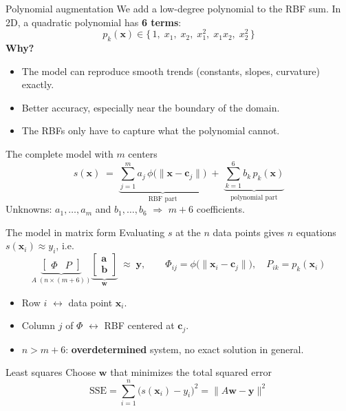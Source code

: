 \documentclass[10pt,aspectratio=169]{beamer}
\newcommand{\hl}[1]{\textcolor{accent}{\textbf{#1}}}
\newcommand{\x}{\bm{x}}
\newcommand{\cc}{\bm{c}}
\begin{document}
\begin{frame}{Polynomial augmentation}
  We add a low-degree polynomial to the RBF sum. In 2D, a quadratic
  polynomial has \hl{6 terms}:
  \[
    p_k(\x) \in \{\,1,\; x_1,\; x_2,\; x_1^2,\; x_1x_2,\; x_2^2\,\}
  \]
  \textbf{Why?}
  \begin{itemize}
    \item The model can reproduce smooth trends (constants, slopes,
          curvature) exactly.
    \item Better accuracy, especially near the boundary of the domain.
    \item The RBFs only have to capture what the polynomial cannot.
  \end{itemize}
  \vspace{0.5em}
  \begin{block}{The complete model with $m$ centers}
    \[
      s(\x) \;=\; \underbrace{\sum_{j=1}^{m} a_j\,
        \phi\big(\lVert \x - \cc_j \rVert\big)}_{\text{RBF part}}
      \;+\; \underbrace{\sum_{k=1}^{6} b_k\, p_k(\x)}_{\text{polynomial part}}
    \]
    Unknowns: $a_1,\dots,a_m$ and $b_1,\dots,b_6$ \;$\Rightarrow$\; $m+6$ coefficients.
  \end{block}
\end{frame}

\begin{frame}{The model in matrix form}
  Evaluating $s$ at the $n$ data points gives $n$ equations
  $s(\x_i) \approx y_i$, i.e.
  \[
    \underbrace{\begin{bmatrix} \Phi & P \end{bmatrix}}_{A\;(n\times(m+6))}
    \underbrace{\begin{bmatrix} \bm{a} \\ \bm{b} \end{bmatrix}}_{\bm{w}}
    \;\approx\; \bm{y},
    \qquad
    \Phi_{ij} = \phi\big(\lVert \x_i - \cc_j\rVert\big), \quad
    P_{ik} = p_k(\x_i)
  \]
  \begin{itemize}
    \item Row $i$ $\leftrightarrow$ data point $\x_i$.
    \item Column $j$ of $\Phi$ $\leftrightarrow$ RBF centered at $\cc_j$.
    \item $n > m+6$: \hl{overdetermined} system, no exact solution in general.
  \end{itemize}
  \vspace{0.3em}
  \begin{block}{Least squares}
    Choose $\bm{w}$ that minimizes the total squared error
    \[
      \text{SSE} = \sum_{i=1}^{n} \big(s(\x_i) - y_i\big)^2
                 = \lVert A\bm{w} - \bm{y} \rVert^2
    \]
  \end{block}
\end{frame}
\end{document}
